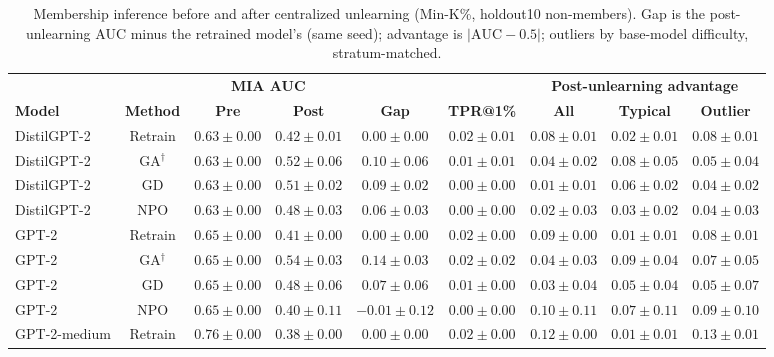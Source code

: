 \begin{table}[t]
\centering
\caption{Membership inference before and after centralized unlearning (Min-K\%, holdout10 non-members). Gap is the post-unlearning AUC minus the retrained model's (same seed); advantage is $|\mathrm{AUC}-0.5|$; outliers by base-model difficulty, stratum-matched.}
\label{tab:central-min-k-prob-holdout10}
\footnotesize
\renewcommand{\arraystretch}{1.2}
\setlength{\tabcolsep}{3pt}
\begin{tabular*}{\textwidth}{@{\extracolsep{\fill}}lcccccccc@{}}
\toprule
 & & \multicolumn{2}{c}{\textbf{MIA AUC}} & & & \multicolumn{3}{c}{\textbf{Post-unlearning advantage}} \\
\cmidrule(lr){3-4}\cmidrule(lr){7-9}
\textbf{Model} & \textbf{Method} & \textbf{Pre} & \textbf{Post} & \textbf{Gap} & \textbf{TPR@1\%} & \textbf{All} & \textbf{Typical} & \textbf{Outlier} \\
\midrule
DistilGPT-2 & Retrain & $0.63 \pm 0.00$ & $0.42 \pm 0.01$ & $0.00 \pm 0.00$ & $0.02 \pm 0.01$ & $0.08 \pm 0.01$ & $0.02 \pm 0.01$ & $0.08 \pm 0.01$ \\
DistilGPT-2 & GA$^{\dagger}$ & $0.63 \pm 0.00$ & $0.52 \pm 0.06$ & $0.10 \pm 0.06$ & $0.01 \pm 0.01$ & $0.04 \pm 0.02$ & $0.08 \pm 0.05$ & $0.05 \pm 0.04$ \\
DistilGPT-2 & GD & $0.63 \pm 0.00$ & $0.51 \pm 0.02$ & $0.09 \pm 0.02$ & $0.00 \pm 0.00$ & $0.01 \pm 0.01$ & $0.06 \pm 0.02$ & $0.04 \pm 0.02$ \\
DistilGPT-2 & NPO & $0.63 \pm 0.00$ & $0.48 \pm 0.03$ & $0.06 \pm 0.03$ & $0.00 \pm 0.00$ & $0.02 \pm 0.03$ & $0.03 \pm 0.02$ & $0.04 \pm 0.03$ \\
GPT-2 & Retrain & $0.65 \pm 0.00$ & $0.41 \pm 0.00$ & $0.00 \pm 0.00$ & $0.02 \pm 0.00$ & $0.09 \pm 0.00$ & $0.01 \pm 0.01$ & $0.08 \pm 0.01$ \\
GPT-2 & GA$^{\dagger}$ & $0.65 \pm 0.00$ & $0.54 \pm 0.03$ & $0.14 \pm 0.03$ & $0.02 \pm 0.02$ & $0.04 \pm 0.03$ & $0.09 \pm 0.04$ & $0.07 \pm 0.05$ \\
GPT-2 & GD & $0.65 \pm 0.00$ & $0.48 \pm 0.06$ & $0.07 \pm 0.06$ & $0.01 \pm 0.00$ & $0.03 \pm 0.04$ & $0.05 \pm 0.04$ & $0.05 \pm 0.07$ \\
GPT-2 & NPO & $0.65 \pm 0.00$ & $0.40 \pm 0.11$ & $-0.01 \pm 0.12$ & $0.00 \pm 0.00$ & $0.10 \pm 0.11$ & $0.07 \pm 0.11$ & $0.09 \pm 0.10$ \\
GPT-2-medium & Retrain & $0.76 \pm 0.00$ & $0.38 \pm 0.00$ & $0.00 \pm 0.00$ & $0.02 \pm 0.00$ & $0.12 \pm 0.00$ & $0.01 \pm 0.01$ & $0.13 \pm 0.01$ \\

\end{tabular*}
\end{table}
